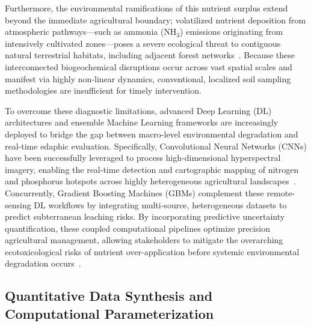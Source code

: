 \documentclass[environremediat,article,accept,pdftex,oneauthor]{Definitions/mdpi}
\begin{document}
Furthermore, the environmental ramifications of this nutrient surplus extend beyond the immediate agricultural boundary; volatilized nutrient deposition from atmospheric pathways—such as ammonia ($\text{NH}_3$) emissions originating from intensively cultivated zones—poses a severe ecological threat to contiguous natural terrestrial habitats, including adjacent forest networks~\cite{Koukianaki2025}. Because these interconnected biogeochemical disruptions occur across vast spatial scales and manifest via highly non-linear dynamics, conventional, localized soil sampling methodologies are insufficient for timely intervention. 

To overcome these diagnostic limitations, advanced Deep Learning (DL) architectures and ensemble Machine Learning frameworks are increasingly deployed to bridge the gap between macro-level environmental degradation and real-time edaphic evaluation. Specifically, Convolutional Neural Networks (CNNs) have been successfully leveraged to process high-dimensional hyperspectral imagery, enabling the real-time detection and cartographic mapping of nitrogen and phosphorus hotspots across highly heterogeneous agricultural landscapes~\cite{Liu1842390}. Concurrently, Gradient Boosting Machines (GBMs) complement these remote-sensing DL workflows by integrating multi-source, heterogeneous datasets to predict subterranean leaching risks. By incorporating predictive uncertainty quantification, these coupled computational pipelines optimize precision agricultural management, allowing stakeholders to mitigate the overarching ecotoxicological risks of nutrient over-application before systemic environmental degradation occurs~\cite{Zhangetal2026}.

\subsection{Quantitative Data Synthesis and Computational
    Parameterization}\label{sec2.2}

\end{document}
